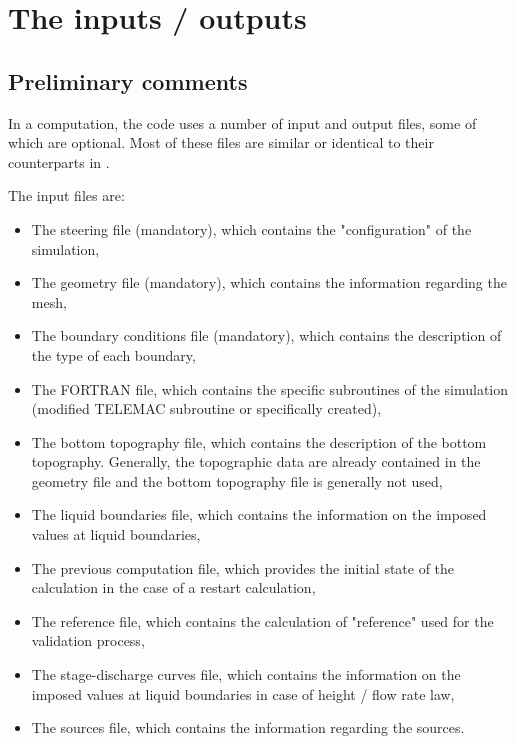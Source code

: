 \chapter{The inputs / outputs}

\section{Preliminary comments}

In a computation, the  code uses a number of input and output files,
some of which are optional. Most of these files are similar or identical to
their counterparts in .

The input files are:

\begin{itemize}
\item The steering file (mandatory), which contains the "configuration" of the
simulation,

\item The geometry file (mandatory), which contains the information regarding
the mesh,

\item The boundary conditions file (mandatory), which contains the description
of the type of each boundary,

\item The FORTRAN file, which contains the specific subroutines of the
simulation (modified TELEMAC subroutine or specifically created),

\item The bottom topography file, which contains the description of the bottom
topography. Generally, the topographic data are already contained in the
geometry file and the bottom topography file is generally not used,

\item The liquid boundaries file, which contains the information on the
imposed values at liquid boundaries,

\item The previous computation file, which provides the initial state of the
calculation in the case of a restart calculation,

\item The reference file, which contains the calculation of "reference" used
for the validation process,

\item The stage-discharge curves file, which contains the information on the
imposed values at liquid boundaries in case of height / flow rate law,

\item The sources file, which contains the information regarding the sources.
\end{itemize}


